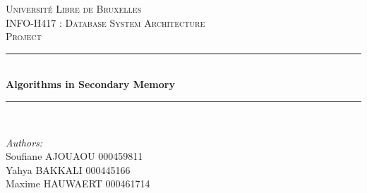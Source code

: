 \documentclass[12pt]{article}
\begin{document}
\begin{titlepage}

\newcommand{\HRule}{\rule{\linewidth}{0.5mm}} %

\center %
 

\textsc{\LARGE Université Libre de Bruxelles}\\[1.5cm] %
\textsc{\Large INFO-H417 : Database System Architecture}\\[0.5cm] %
\textsc{\large Project}\\[0.5cm] %


\HRule \\[0.4cm]
{ \huge \bfseries Algorithms in Secondary Memory}\\[0.4cm] %
\HRule \\[1.2cm]
 

\begin{minipage}{0.8\textwidth}
\begin{flushleft} \large
\emph{Authors:}\\
Soufiane \textsc{AJOUAOU} 000459811\\%
Yahya \textsc{BAKKALI} 000445166\\
Maxime \textsc{HAUWAERT} 000461714
\end{flushleft}
\end{minipage}
~
\begin{minipage}{0.4\textwidth}
\begin{flushright} \large
\end{flushright}
\end{minipage}\\[2cm]


\end{titlepage}
\end{document}
